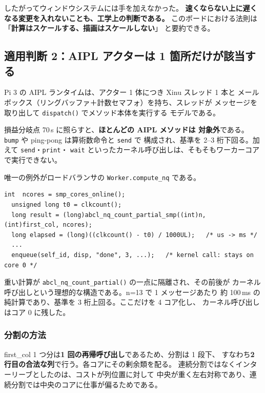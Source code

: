 \noindent
したがってウィンドウシステムには手を加えなかった。
\textbf{速くならない上に遅くなる変更を入れないことも、工学上の判断である。}
このボードにおける法則は「\textbf{計算はスケールする、描画はスケールしない}」
と要約できる。

\subsection{適用判断 2：AIPL アクターは 1 箇所だけが該当する}

Pi 3 の AIPL ランタイムは、アクター 1 体につき Xinu スレッド 1 本と
メールボックス（リングバッファ＋計数セマフォ）を持ち、スレッドが
メッセージを取り出して \texttt{dispatch()} でメソッド本体を実行する
モデルである。

損益分岐点 70\,\textmu s に照らすと、\textbf{ほとんどの AIPL メソッドは
対象外}である。\texttt{bump} や ping-pong は算術数命令と \texttt{send} で
構成され、基準を 2--3 桁下回る。加えて \texttt{send}・\texttt{print}・
\texttt{wait} といったカーネル呼び出しは、そもそもワーカーコアで実行できない。

唯一の例外がロードバランサの \texttt{Worker.compute\_nq} である。

\begin{lstlisting}[caption={対象となる構造（\texttt{apps/abcl\_program.c}）}]
  int  ncores = smp_cores_online();
  unsigned long t0 = clkcount();
  long result = (long)abcl_nq_count_partial_smp((int)n, (int)first_col, ncores);
  long elapsed = (long)((clkcount() - t0) / 1000UL);   /* us -> ms */
  ...
  enqueue(self_id, disp, "done", 3, ...);   /* kernel call: stays on core 0 */
\end{lstlisting}

\noindent
重い計算が \texttt{abcl\_nq\_count\_partial()} の一点に隔離され、その前後が
カーネル呼び出しという理想的な構造である。n=13 で 1 メッセージあたり
約 100\,ms の純計算であり、基準を 3 桁上回る。ここだけを 4 コア化し、
カーネル呼び出しはコア 0 に残した。

\subsubsection*{分割の方法}

first\_col 1 つ分は\textbf{1 回の再帰呼び出し}であるため、分割は 1 段下、
すなわち\textbf{2 行目の合法な列}で行う。各コアにその剰余類を配る。
連続分割ではなくインターリーブとしたのは、コストが列位置に対して
中央が重く左右対称であり、連続分割では中央のコアに仕事が偏るためである。


